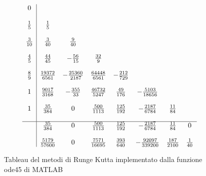 \begin{figure}
$$\begin{array}{c|ccccccc}
0					&									&									&									&								&											&						&		\\ \\
\frac{1}{5}	&	\frac{1}{5}				&									&									&								&											&						&		\\ \\
\frac{3}{10}	&	\frac{3}{40}				&	\frac{9}{40}				&									&								&											&						&		\\ \\
\frac{4}{5}	&	\frac{44}{45}			&	-\frac{56}{15}			&	\frac{32}{9}				&								&											&						&		\\ \\
\frac{8}{9}	&	\frac{19372}{6561}	&	-\frac{25360}{2187}&	\frac{64448}{6561}	&	-\frac{212}{729}	&											&						&		\\ \\
1					&	\frac{9017}{3168}	&	-\frac{355}{33}		&	\frac{46732}{5247}	&	\frac{49}{176}		&	-\frac{5103}{18656}		&						&		\\ \\
1					&	\frac{35}{384}			&	0								&	\frac{500}{1113}		&	\frac{125}{192	}	&-\frac{2187}{6784}			&	\frac{11}{84}	&		\\	\\		
\hline
					&	\frac{35}{384}			&	0								&	\frac{500}{1113}		&	\frac{125}{192}	&-\frac{2187}{6784}			&	\frac{11}{84}	&	0	\\ \\
				&	\frac{5179}{57600}	&	0						&	\frac{7571}{16695}	&	\frac{393}{640}		&	-\frac{92097}{339200}	&	\frac{187}{2100}	&	\frac{1}{40}
\end{array}$$
\caption{Tableau del metodi di Runge Kutta implementato dalla funzione ode45 di MATLAB}
\label{fig::ode45}
\end{figure}
